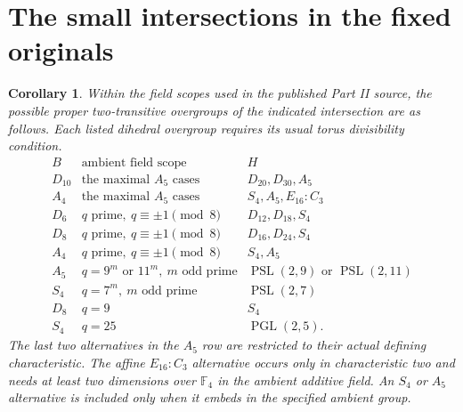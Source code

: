 \documentclass[11pt]{article}
\newtheorem{corollary}[theorem]{Corollary}
\newcommand{\PSL}{\operatorname{PSL}}
\newcommand{\PGL}{\operatorname{PGL}}
\newcommand{\F}{\mathbb F}
\begin{document}
\section{The small intersections in the fixed originals}
\begin{corollary}\label{small}
Within the field scopes used in the published Part II source,
the possible proper two-transitive overgroups of the indicated
intersection are as follows. Each listed dihedral overgroup
requires its usual torus divisibility condition.
\[
\begin{array}{c|l|l}
B&\text{ambient field scope}&H\\\hline
D_{10}&\text{the maximal }A_5\text{ cases}&D_{20},D_{30},A_5\\
A_4&\text{the maximal }A_5\text{ cases}&S_4,A_5,E_{16}:C_3\\
D_6&q\text{ prime},\ q\equiv\pm1\pmod8&D_{12},D_{18},S_4\\
D_8&q\text{ prime},\ q\equiv\pm1\pmod8&D_{16},D_{24},S_4\\
A_4&q\text{ prime},\ q\equiv\pm1\pmod8&S_4,A_5\\
A_5&q=9^m\text{ or }11^m,\ m\text{ odd prime}
 &\PSL(2,9)\text{ or }\PSL(2,11)\\
S_4&q=7^m,\ m\text{ odd prime}&\PSL(2,7)\\
D_8&q=9&S_4\\
S_4&q=25&\PGL(2,5).
\end{array}
\]
The last two alternatives in the $A_5$ row are restricted to
their actual defining characteristic. The affine $E_{16}:C_3$
alternative occurs only in characteristic two and needs at
least two dimensions over $\F_4$ in the ambient additive field.
An $S_4$ or $A_5$ alternative is included only when it embeds
in the specified ambient group.
\end{corollary}
\end{document}
